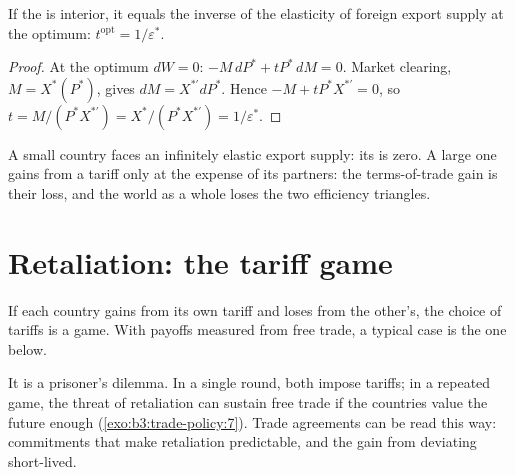\begin{proposition}\label{prop:b3:trade-policy:optimal}
If the  is interior, it equals the inverse of the elasticity of
foreign export supply at the optimum: $t^{\mathrm{opt}} = 1/\varepsilon^*$.
\end{proposition}

\begin{proof}
At the optimum $dW = 0$: $-M\,dP^* + tP^*\,dM = 0$. Market clearing, $M = X^*(P^*)$, gives
$dM = X^{*\prime}dP^*$. Hence $-M + tP^*X^{*\prime} = 0$, so $t = M/(P^*X^{*\prime}) = X^*/(P^*X^{*\prime}) =
1/\varepsilon^*$.
\end{proof}

A small country faces an infinitely elastic export supply: its  is
zero. A large one gains from a tariff only at the expense of its partners: the
terms-of-trade gain is their loss, and the world as a whole loses the two
efficiency triangles.

\section{Retaliation: the tariff game}\label{sec:b3:trade-policy:game}

If each country gains from its own tariff and loses from the other's, the choice
of tariffs is a game. With payoffs measured from free trade, a typical case is
the one below.

\begin{omfigure}
\par{}
\end{omfigure}

It is a prisoner's dilemma. In a single round, both impose tariffs; in a repeated
game, the threat of retaliation can sustain free trade if the countries value
the future enough (\cref{exo:b3:trade-policy:7}). Trade agreements can be read
this way: commitments that make retaliation predictable, and the gain from
deviating short-lived.

